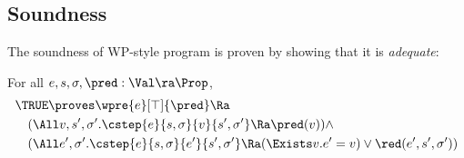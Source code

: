 \subsection{Soundness}

The soundness of WP-style program is proven by showing that it is \emph{adequate}:

\begin{lemma}
For all $e, s, \sigma, \pred: \Val \ra \Prop$,
\begin{align*}
&\TRUE \proves \wpre{e}[\top]{\pred} \Ra \\
&\quad (\All v, s', \sigma'. \cstep{e}{s, \sigma}{v}{s', \sigma'} \Ra \pred(v)) \land \\
&\quad (\All e', \sigma'. \cstep{e}{s, \sigma}{e'}{s', \sigma'} \Ra (\Exists v. e' = v) \lor \red(e', s', \sigma'))
\end{align*}
\end{lemma}

